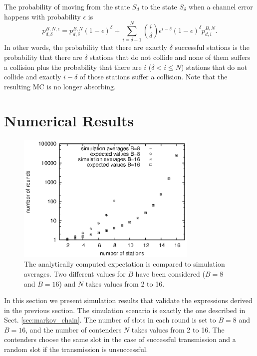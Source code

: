 \documentclass[journal]{IEEEtran}
\begin{document}
The probability of moving from the state $S_d$ to the state $S_\delta$ when a channel error happens with probability $\epsilon$ is
\begin{equation}
\label{eq:psiBNepsilon}
p^{B,N,\epsilon}_{d,\delta}= p^{B,N}_{d,\delta} (1-\epsilon)^\delta + \sum_{i=\delta+1}^{N} \binom{i}{\delta} \epsilon^{i-\delta}(1-\epsilon)^\delta p^{B,N}_{d,i}.
\end{equation}
In other words, the probability that there are exactly $\delta$ successful stations is the probability that there are $\delta$ stations that do not collide and none of them suffers a collision plus the probability that there are $i$ ($\delta < i \leq N$) stations that do not collide and exactly $i-\delta$ of those stations suffer a collision.
Note that the resulting MC is no longer absorbing.

\section{Numerical Results}
\label{sec:numerical_results}

\begin{figure}
\centering
\includegraphics[height=6.2cm]{figures/convergence_avg}
\caption{The analytically computed expectation is compared to simulation averages. Two different values for $B$ have been considered ($B=8$ and $B=16$) and $N$ takes values from 2 to 16.}
\label{fig:convergence_avg}
\end{figure}


In this section we present simulation results that validate the expressions derived in the previous section.
The simulation scenario is exactly the one described in Sect. \ref{sec:markov_chain}.
The number of slots in each round is set to $B=8$ and $B=16$, and the number of contenders $N$ takes values from 2 to 16.
The contenders choose the same slot in the case of successful transmission and a random slot if the transmission is unsuccessful.
\end{document}
